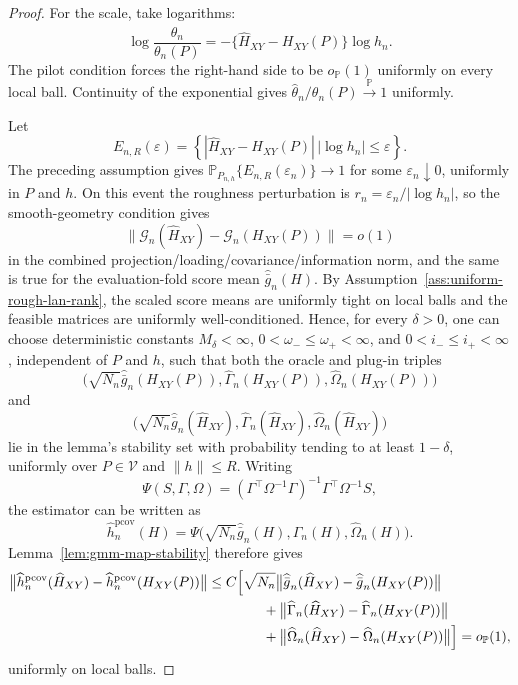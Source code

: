 \documentclass[11pt,a4paper]{amsart}
\theoremstyle{plain}
\theoremstyle{definition}
\theoremstyle{remark}
\newcommand{\PP}{\mathbb{P}}
\newcommand{\toP}{\xrightarrow{\PP}}
\begin{document}
\begin{proof}
For the scale, take logarithms:
\[
        \log\frac{\widehat\theta_n}{\theta_n(P)}
        =
        -\{\widehat H_{XY}-H_{XY}(P)\}\log h_n .
\]
The pilot condition forces the right-hand side to be \(o_{\PP}(1)\) uniformly on every local ball.
Continuity of the exponential gives \(\widehat\theta_n/\theta_n(P)\toP 1\) uniformly.

Let
\[
        E_{n,R}(\varepsilon)
        =
        \left\{
        |\widehat H_{XY}-H_{XY}(P)|\,|\log h_n|\le\varepsilon
        \right\}.
\]
The preceding assumption gives \(\PP_{P_{n,h}}\{E_{n,R}(\varepsilon_n)\}\to1\) for some
\(\varepsilon_n\downarrow0\), uniformly in \(P\) and \(h\).  On this event the roughness
perturbation is \(r_n=\varepsilon_n/|\log h_n|\), so the smooth-geometry condition gives
\[
        \|\mathcal G_n(\widehat H_{XY})-\mathcal G_n(H_{XY}(P))\|=o(1)
\]
in the combined projection/loading/covariance/information norm, and the same is true for the
evaluation-fold score mean \(\widehat{\bar g}_n(H)\).  By
Assumption~\ref{ass:uniform-rough-lan-rank}, the scaled score means are uniformly tight on local
balls and the feasible matrices are uniformly well-conditioned.  Hence, for every \(\delta>0\),
one can choose deterministic constants \(M_\delta<\infty\),
\(0<\omega_-\le\omega_+<\infty\), and \(0<i_-\le i_+<\infty\), independent of \(P\) and \(h\),
such that both the oracle and plug-in triples
\[
        \bigl(
        \sqrt{N_n}\widehat{\bar g}_n(H_{XY}(P)),
        \widehat\Gamma_n(H_{XY}(P)),
        \widehat\Omega_n(H_{XY}(P))
        \bigr)
\]
and
\[
        \bigl(
        \sqrt{N_n}\widehat{\bar g}_n(\widehat H_{XY}),
        \widehat\Gamma_n(\widehat H_{XY}),
        \widehat\Omega_n(\widehat H_{XY})
        \bigr)
\]
lie in the lemma's stability set with probability tending to at least \(1-\delta\), uniformly over
\(P\in\mathcal V\) and \(\|h\|\le R\).  Writing
\[
        \Psi(S,\Gamma,\Omega)
        =
        (\Gamma^\top\Omega^{-1}\Gamma)^{-1}\Gamma^\top\Omega^{-1}S,
\]
the estimator can be written as
\[
        \widehat h_n^{\mathrm{pcov}}(H)=
        \Psi\bigl(\sqrt{N_n}\widehat{\bar g}_n(H),\widehat\Gamma_n(H),\widehat\Omega_n(H)\bigr).
\]
Lemma~\ref{lem:gmm-map-stability} therefore gives
\[
\begin{aligned}
        \bigl\|
        \widehat h_n^{\mathrm{pcov}}(\widehat H_{XY})
        -
        \widehat h_n^{\mathrm{pcov}}(H_{XY}(P))
        \bigr\|
        &\le
        C\Bigl[
        \sqrt{N_n}\bigl\|
        \widehat{\bar g}_n(\widehat H_{XY})
        -
        \widehat{\bar g}_n(H_{XY}(P))
        \bigr\| \\
        &\qquad\qquad+
        \bigl\|
        \widehat\Gamma_n(\widehat H_{XY})
        -
        \widehat\Gamma_n(H_{XY}(P))
        \bigr\| \\
        &\qquad\qquad+
        \bigl\|
        \widehat\Omega_n(\widehat H_{XY})
        -
        \widehat\Omega_n(H_{XY}(P))
        \bigr\|
        \Bigr]
        =
        o_{\PP}(1),
\end{aligned}
\]
uniformly on local balls.


\end{proof}
\end{document}
